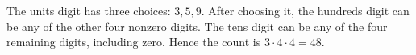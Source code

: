 The units digit has three choices: $3,5,9$. After choosing it, the hundreds digit can be any of the other four nonzero digits. The tens digit can be any of the four remaining digits, including zero. Hence the count is $3\cdot4\cdot4=\boxed{48}$.
